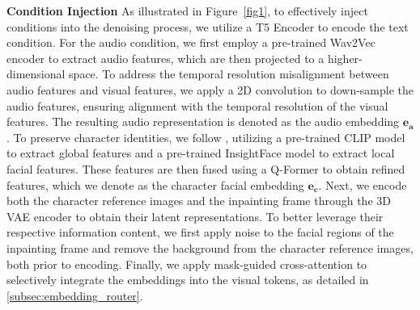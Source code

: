 \noindent\textbf{Condition Injection}
As illustrated in Figure~\ref{fig1}, to effectively inject conditions into the denoising process, we utilize a T5 Encoder \cite{raffel2020exploring} to encode the text condition. For the audio condition, we first employ a pre-trained Wav2Vec \cite{baevski2020wav2vec} encoder to extract audio features, which are then projected to a higher-dimensional space. To address the temporal resolution misalignment between audio features and visual features, we apply a 2D convolution to down-sample the audio features, ensuring alignment with the temporal resolution of the visual features. The resulting audio representation is denoted as the audio embedding $\mathbf{e_a}$. 
To preserve character identities, we follow \cite{yuan_identity-preserving_2024}, utilizing a pre-trained CLIP model \cite{radford2021learning} to extract global features and a pre-trained InsightFace model \cite{deepinsight2024insightface} to extract local facial features. These features are then fused using a Q-Former \cite{li2023blip} to obtain refined features, which we denote as the character facial embedding $\mathbf{e_{c}}$.
Next, we encode both the character reference images and the inpainting frame through the 3D VAE encoder to obtain their latent representations. To better leverage their respective information content, we first apply noise to the facial regions of the inpainting frame and remove the background from the character reference images, both prior to encoding.
Finally, we apply mask-guided cross-attention to selectively integrate the embeddings into the visual tokens, as detailed in \ref{subsec:embedding_router}.
